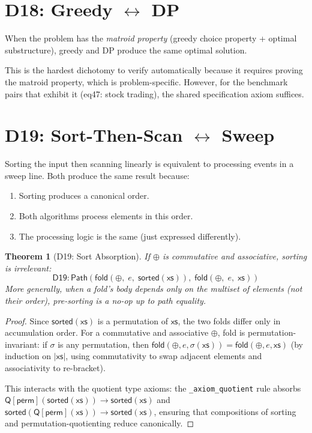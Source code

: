 \documentclass[11pt,a4paper]{report}
\theoremstyle{definition}
\theoremstyle{plain}
\newtheorem{theorem}[definition]{Theorem}
\newcommand{\Path}{\mathsf{Path}}
\newcommand{\fold}{\mathsf{fold}}
\begin{document}
\section{D18: Greedy $\leftrightarrow$ DP}

When the problem has the \emph{matroid property} (greedy choice
property + optimal substructure), greedy and DP produce the same
optimal solution.

This is the hardest dichotomy to verify automatically because it
requires proving the matroid property, which is problem-specific.
However, for the benchmark pairs that exhibit it (eq47: stock
trading), the shared specification axiom suffices.

\section{D19: Sort-Then-Scan $\leftrightarrow$ Sweep}
\label{sec:d19-sort}

Sorting the input then scanning linearly is equivalent to processing
events in a sweep line.  Both produce the same result because:
\begin{enumerate}
  \item Sorting produces a canonical order.
  \item Both algorithms process elements in this order.
  \item The processing logic is the same (just expressed differently).
\end{enumerate}

\begin{theorem}[D19: Sort Absorption]
\label{thm:d19-sort}
If $\oplus$ is commutative and associative, sorting is irrelevant:
\[
  \mathsf{D19} : \Path\!\left(
    \fold(\oplus,\; e,\; \mathsf{sorted}(\mathsf{xs})),\;
    \fold(\oplus,\; e,\; \mathsf{xs})
  \right)
\]
More generally, when a fold's body depends only on the
\emph{multiset} of elements (not their order), pre-sorting is a
no-op up to path equality.
\end{theorem}

\begin{proof}
Since $\mathsf{sorted}(\mathsf{xs})$ is a permutation of $\mathsf{xs}$,
the two folds differ only in accumulation order.  For a commutative
and associative $\oplus$, fold is permutation-invariant: if
$\sigma$ is any permutation, then
$\fold(\oplus, e, \sigma(\mathsf{xs})) = \fold(\oplus, e, \mathsf{xs})$
(by induction on $|\mathsf{xs}|$, using commutativity to swap adjacent
elements and associativity to re-bracket).

This interacts with the quotient type axioms: the
\texttt{\_axiom\_quotient} rule absorbs
$\mathsf{Q}[\mathsf{perm}](\mathsf{sorted}(\mathsf{xs})) \to
\mathsf{sorted}(\mathsf{xs})$ and
$\mathsf{sorted}(\mathsf{Q}[\mathsf{perm}](\mathsf{xs})) \to
\mathsf{sorted}(\mathsf{xs})$, ensuring that compositions of sorting
and permutation-quotienting reduce canonically.
\end{proof}
\end{document}
